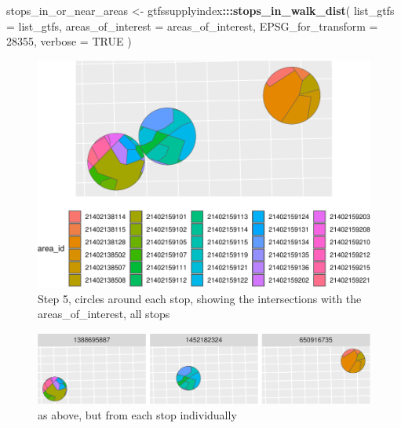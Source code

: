 \documentclass[preprint, 3p,
authoryear]{elsarticle} %
\newenvironment{Shaded}{\begin{snugshade}}{\end{snugshade}}
\newcommand{\AttributeTok}[1]{\textcolor[rgb]{0.13,0.29,0.53}{#1}}
\newcommand{\ConstantTok}[1]{\textcolor[rgb]{0.56,0.35,0.01}{#1}}
\newcommand{\DecValTok}[1]{\textcolor[rgb]{0.00,0.00,0.81}{#1}}
\newcommand{\FunctionTok}[1]{\textcolor[rgb]{0.13,0.29,0.53}{\textbf{#1}}}
\newcommand{\NormalTok}[1]{#1}
\newcommand{\OtherTok}[1]{\textcolor[rgb]{0.56,0.35,0.01}{#1}}
\newcommand{\SpecialCharTok}[1]{\textcolor[rgb]{0.81,0.36,0.00}{\textbf{#1}}}
\begin{document}
\begin{Shaded}
\begin{Highlighting}[]
\NormalTok{stops\_in\_or\_near\_areas }\OtherTok{\textless{}{-}}\NormalTok{ gtfssupplyindex}\SpecialCharTok{:::}\FunctionTok{stops\_in\_walk\_dist}\NormalTok{(}
  \AttributeTok{list\_gtfs =}\NormalTok{ list\_gtfs, }
  \AttributeTok{areas\_of\_interest =}\NormalTok{ areas\_of\_interest,}
  \AttributeTok{EPSG\_for\_transform =} \DecValTok{28355}\NormalTok{, }
  \AttributeTok{verbose =} \ConstantTok{TRUE}
\NormalTok{)}
\end{Highlighting}
\end{Shaded}

\begin{figure}
\includegraphics[width=1\linewidth]{Leveraging_GTFS_to_assess_transit_supply_Transport_Geography_files/figure-latex/calculate_stop_in_or_near_areas_verbose-1} \caption{Step 5, circles around each stop, showing the intersections with the areas_of_interest, all stops}\label{fig:calculate_stop_in_or_near_areas_verbose-1}
\end{figure}
\begin{figure}
\includegraphics[width=1\linewidth]{Leveraging_GTFS_to_assess_transit_supply_Transport_Geography_files/figure-latex/calculate_stop_in_or_near_areas_verbose-2} \caption{as above, but from each stop individually}\label{fig:calculate_stop_in_or_near_areas_verbose-2}
\end{figure}
\end{document}
